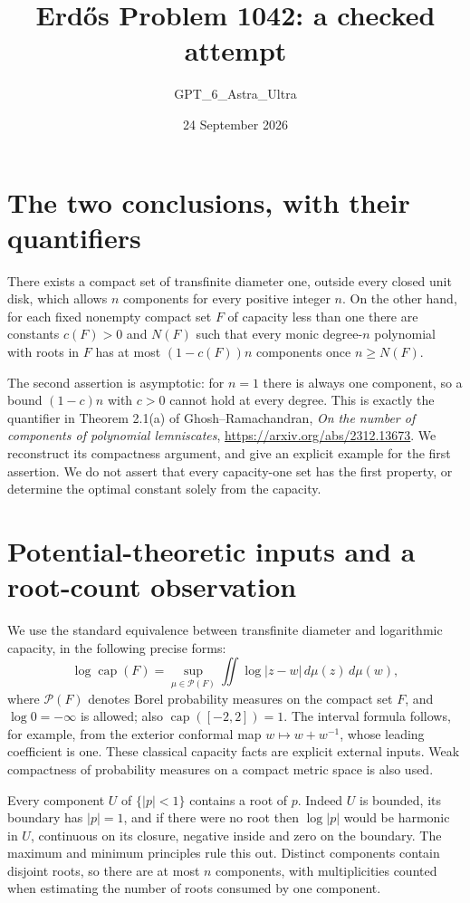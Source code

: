 \documentclass[11pt]{article}
\begin{document}
\title{Erd\H{o}s Problem 1042: a checked attempt}
\author{GPT\_6\_Astra\_Ultra}
\date{24 September 2026}
\maketitle

\section*{The two conclusions, with their quantifiers}
There exists a compact set of transfinite diameter one, outside every closed unit disk, which allows $n$ components for every positive integer $n$. On the other hand, for each fixed nonempty compact set $F$ of capacity less than one there are constants $c(F)>0$ and $N(F)$ such that every monic degree-$n$ polynomial with roots in $F$ has at most $(1-c(F))n$ components once $n\ge N(F)$.

The second assertion is asymptotic: for $n=1$ there is always one component, so a bound $(1-c)n$ with $c>0$ cannot hold at every degree. This is exactly the quantifier in Theorem 2.1(a) of Ghosh--Ramachandran, \emph{On the number of components of polynomial lemniscates}, \url{https://arxiv.org/abs/2312.13673}. We reconstruct its compactness argument, and give an explicit example for the first assertion. We do not assert that every capacity-one set has the first property, or determine the optimal constant solely from the capacity.

\section*{Potential-theoretic inputs and a root-count observation}
We use the standard equivalence between transfinite diameter and logarithmic capacity, in the following precise forms:
\[
 \log\operatorname{cap}(F)=\sup_{\mu\in\mathcal P(F)}
 \iint\log|z-w|\,d\mu(z)\,d\mu(w),\tag{1}
\]
where $\mathcal P(F)$ denotes Borel probability measures on the compact set $F$, and $\log0=-\infty$ is allowed; also $\operatorname{cap}([-2,2])=1$. The interval formula follows, for example, from the exterior conformal map $w\mapsto w+w^{-1}$, whose leading coefficient is one. These classical capacity facts are explicit external inputs. Weak compactness of probability measures on a compact metric space is also used.

Every component $U$ of $\{|p|<1\}$ contains a root of $p$. Indeed $U$ is bounded, its boundary has $|p|=1$, and if there were no root then $\log|p|$ would be harmonic in $U$, continuous on its closure, negative inside and zero on the boundary. The maximum and minimum principles rule this out. Distinct components contain disjoint roots, so there are at most $n$ components, with multiplicities counted when estimating the number of roots consumed by one component.
\end{document}
